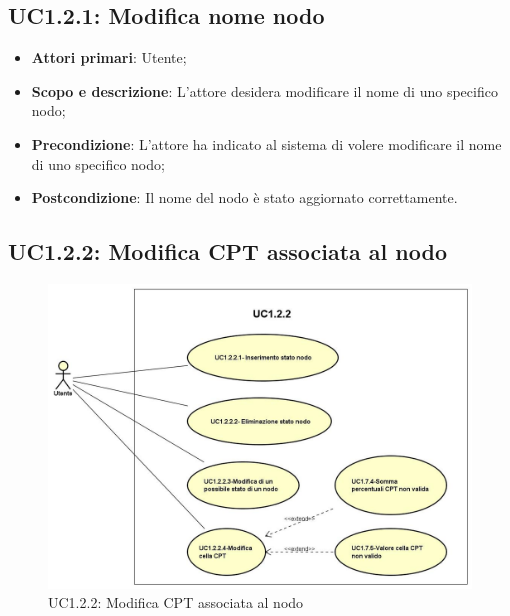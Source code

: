 \subsection{UC1.2.1: Modifica nome nodo} 
\begin{itemize} 
	\item{\textbf{Attori primari}: Utente;} 
	\item{\textbf{Scopo e descrizione}: L'attore desidera modificare il nome di uno specifico nodo;} 
	\item{\textbf{Precondizione}: L'attore ha indicato al sistema di volere modificare il nome di uno specifico nodo;} 
	\item{\textbf{Postcondizione}: Il nome del nodo è stato aggiornato correttamente.} 
\end{itemize} 
\subsection{UC1.2.2: Modifica CPT associata al nodo} 
\begin{figure} [H]
	\centering
	\includegraphics[scale=0.45]{Img/UC1-2-2} 
	\caption{UC1.2.2: Modifica CPT associata al nodo} \label{} 
\end{figure} 

